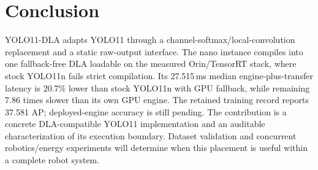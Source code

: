 \section{Conclusion}
YOLO11-DLA adapts YOLO11 through a channel-softmax/local-convolution replacement
and a static raw-output interface. The nano instance compiles into one
fallback-free DLA loadable on the measured Orin/TensorRT stack, where stock
YOLO11n fails strict compilation. Its 27.515\,ms median engine-plus-transfer
latency is 20.7\% lower than stock YOLO11n with GPU fallback, while remaining
7.86 times slower than its own GPU engine. The retained training record reports
37.581 AP; deployed-engine accuracy is still pending. The contribution is a
concrete DLA-compatible YOLO11 implementation and an auditable characterization
of its execution boundary. Dataset validation and concurrent robotics/energy
experiments will determine when this placement is useful within a complete
robot system.
